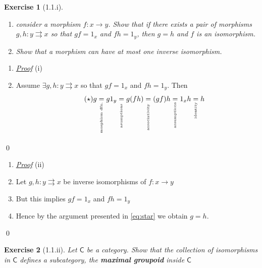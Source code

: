 \documentclass{article}
\theoremstyle{spacious}
\newtheorem*{prm}{Exercise}
\newenvironment{pf}{\begin{enumerate} \item[] \textit{\underline{Proof}} }{\end{enumerate}\qed}
\renewcommand{\:}{\vcentcolon=} %
\newcommand{\jeq}[1]{\underset{\rotatebox{90}{\tiny\text{ #1}}}{=}}
\begin{document}
\begin{prm}[1.1.i]
\phantom{t}
    \begin{enumerate}
        \item consider a morphism \(f:x\to y\).  Show that if there exists a pair of morphisms \(g,h: y \rightrightarrows x\) so that \(gf=1_x\) and \(fh=1_y\), then \(g=h\) and \(f\) is an isomorphism.
        \item Show that a morphism can have at most one inverse isomorphism.
    \end{enumerate}
\end{prm}

\begin{pf}{(i)}
    \item[] Assume \(\exists g,h:y\rightrightarrows x\) so that \(gf=1_x\) and \(fh=1_y\).  Then
    \begin{equation}\tag{$\star$}\label{eq:star}
        g\jeq{morphism dfn.} g1_y\jeq{asumptions }g(fh)\jeq{associativity }(gf)h\jeq{assumptions}1_xh\jeq{identity}h
    \end{equation}
\end{pf}

\begin{pf}{(ii)}
    \item[] Let \(g,h:y\rightrightarrows x\) be inverse isomorphisms of \(f:x\to y\)
    \item[] But this implies \(gf=1_x\) and \(fh=1_y\)
    \item[] Hence by the argument presented in \eqref{eq:star} we obtain \(g=h\).
\end{pf}

\begin{prm}[1.1.ii] Let \(\mathsf{C}\) be a category.  Show that the collection of isomorphisms in \(\mathsf{C}\) defines a subcategory, the \textbf{maximal groupoid} inside \(\mathsf{C}\)
\end{prm}
\end{document}
